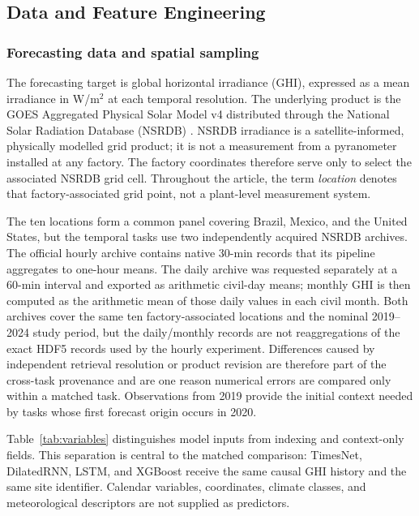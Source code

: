 \subsection{Data and Feature Engineering}
\label{sec:data}

\subsubsection{Forecasting data and spatial sampling}

The forecasting target is global horizontal irradiance (GHI), expressed as a
mean irradiance in W/m$^2$ at each temporal resolution. The underlying product
is the GOES Aggregated Physical Solar Model v4 distributed through the National
Solar Radiation Database (NSRDB) \cite{sengupta2018,nlr2026}. NSRDB irradiance
is a satellite-informed, physically modelled grid product; it is not a
measurement from a pyranometer installed at any factory. The factory
coordinates therefore serve only to select the associated NSRDB grid cell.
Throughout the article, the term \emph{location} denotes that
factory-associated grid point, not a plant-level measurement system.

The ten locations form a common panel covering Brazil, Mexico, and the United
States, but the temporal tasks use two independently acquired NSRDB archives.
The official hourly archive contains native 30-min records that its pipeline
aggregates to one-hour means. The daily archive was requested separately at a
60-min interval and exported as arithmetic civil-day means; monthly GHI is then
computed as the arithmetic mean of those daily values in each civil month.
Both archives cover the same ten factory-associated locations and the nominal
2019--2024 study period, but the daily/monthly records are not reaggregations of
the exact HDF5 records used by the hourly experiment. Differences caused by
independent retrieval resolution or product revision are therefore part of the
cross-task provenance and are one reason numerical errors are compared only
within a matched task. Observations from 2019 provide the initial context needed
by tasks whose first forecast origin occurs in 2020.

Table~\ref{tab:variables} distinguishes model inputs from indexing and
context-only fields. This separation is central to the matched comparison:
TimesNet, DilatedRNN, LSTM, and XGBoost receive the same causal GHI history and
the same site identifier. Calendar variables, coordinates, climate classes,
and meteorological descriptors are not supplied as predictors.

